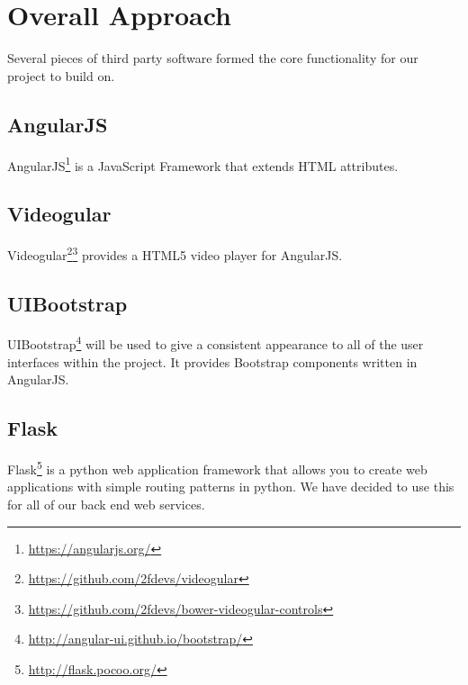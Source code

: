 \chapter{Overall Approach} 
\label{Chapter:Overall Approach}
Several pieces of third party software formed the core functionality for our project to build on. 
\section{AngularJS}
\label{Section:AngularJS}
AngularJS\footnote{\url{https://angularjs.org/}} is a JavaScript Framework that extends HTML attributes.
\section{Videogular}
\label{Section:Videogular}
Videogular\footnote{\url{https://github.com/2fdevs/videogular}}\footnote{\url{https://github.com/2fdevs/bower-videogular-controls}} provides a HTML5 video player for AngularJS.

\section{UIBootstrap}
\label{Section:UIBootstrap}
UIBootstrap\footnote{\url{http://angular-ui.github.io/bootstrap/}} will be used to give a consistent appearance to all of the user interfaces within the project. It provides Bootstrap components written in AngularJS.

\section{Flask}
\label{Section:Flask}
Flask\footnote{\url{http://flask.pocoo.org/}} is a python web application framework that allows you to create web applications with simple routing patterns in python. We have decided to use this for all of our back end web services.